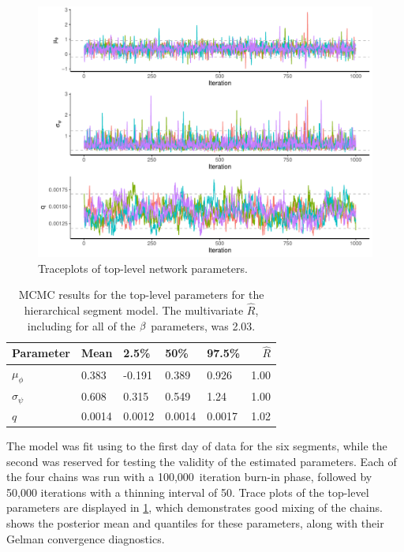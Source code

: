 \begin{knitrout}\small
{}\color{fgcolor}\begin{figure}

{\centering \includegraphics[width=\textwidth]{figure/nw_model_n2_diag-1} 

}

\caption[Traceplots of top-level network parameters]{Traceplots of top-level network parameters.}\label{fig:nw_model_n2_diag}
\end{figure}


\end{knitrout}


\begin{table}

\caption{\label{tab:nw_model_n2_smry}MCMC results for the top-level parameters for the hierarchical segment model. The multivariate $\hat R$, including for all of the $\beta$ parameters, was 2.03.}
\centering
\begin{tabular}[b]{lllllr}
\toprule
Parameter & Mean & 2.5\% & 50\% & 97.5\% & $\hat R$\\
\midrule
$\mu_\phi$ & 0.383 & -0.191 & 0.389 & 0.926 & 1.00\\
$\sigma_\psi$ & 0.608 & 0.315 & 0.549 & 1.24 & 1.00\\
$q$ & 0.0014 & 0.0012 & 0.0014 & 0.0017 & 1.02\\
\bottomrule
\end{tabular}
\end{table}




The model was fit using  to the first day of data for the six segments, while the second was reserved for testing the validity of the estimated parameters. Each of the four chains was run with a 100,000~iteration burn-in phase, followed by 50,000 iterations with a thinning interval of 50. Trace plots of the top-level parameters are displayed in \cref{fig:nw_model_n2_diag}, which demonstrates good mixing of the chains.  shows the posterior mean and quantiles for these parameters, along with their Gelman convergence diagnostics.


